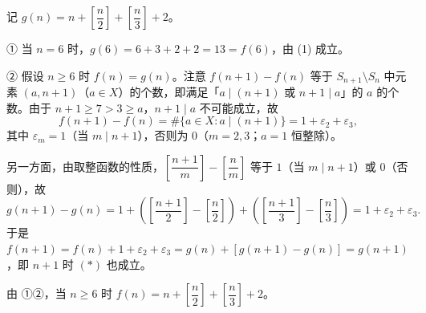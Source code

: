 \begin{answer}
记 \(g(n)=n+\left[\dfrac{n}{2}\right]+\left[\dfrac{n}{3}\right]+2\)。

① 当 \(n=6\) 时，\(g(6)=6+3+2+2=13=f(6)\)，由 (1) 成立。

② 假设 \(n\geqslant6\) 时 \(f(n)=g(n)\)。注意 \(f(n+1)-f(n)\) 等于 \(S_{n+1}\setminus S_{n}\) 中元素 \((a,n+1)\)（\(a\in X\)）的个数，即满足「\(a\mid(n+1)\) 或 \(n+1\mid a\)」的 \(a\) 的个数。由于 \(n+1\geqslant7>3\geqslant a\)，\(n+1\mid a\) 不可能成立，故
\nopagebreak[4]
\[
f(n+1)-f(n)=\#\{a\in X:a\mid(n+1)\}=1+\varepsilon_{2}+\varepsilon_{3},
\]
其中 \(\varepsilon_{m}=1\)（当 \(m\mid n+1\)），否则为 \(0\)（\(m=2,3\)；\(a=1\) 恒整除）。

另一方面，由取整函数的性质，\(\left[\dfrac{n+1}{m}\right]-\left[\dfrac{n}{m}\right]\) 等于 \(1\)（当 \(m\mid n+1\)）或 \(0\)（否则），故
\nopagebreak[4]
\[
g(n+1)-g(n)=1+\left(\left[\frac{n+1}{2}\right]-\left[\frac{n}{2}\right]\right)+\left(\left[\frac{n+1}{3}\right]-\left[\frac{n}{3}\right]\right)=1+\varepsilon_{2}+\varepsilon_{3}.
\]
于是 \(f(n+1)=f(n)+1+\varepsilon_{2}+\varepsilon_{3}=g(n)+\left[g(n+1)-g(n)\right]=g(n+1)\)，即 \(n+1\) 时 \((*)\) 也成立。

由 ①②，当 \(n\geqslant6\) 时 \(f(n)=n+\left[\dfrac{n}{2}\right]+\left[\dfrac{n}{3}\right]+2\)。



\end{answer}